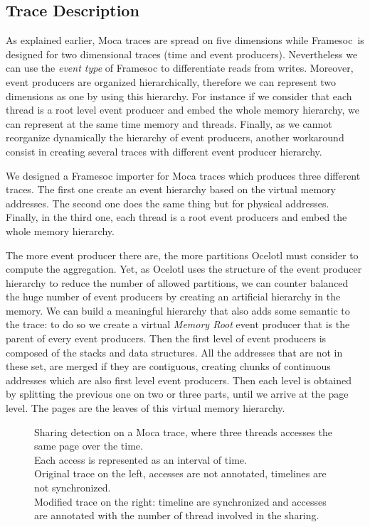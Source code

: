 \subsection{Trace Description}

As explained earlier, \gls{Moca} traces are spread on five dimensions while \gls{Framesoc} is designed for two dimensional traces (time and event producers).
Nevertheless we can use the \emph{event type} of \gls{Framesoc} to differentiate reads from writes.
Moreover, event producers are organized hierarchically, therefore we can represent two dimensions as one by using this hierarchy.
For instance if we consider that each thread is a root level event producer and embed the whole memory hierarchy, we can represent at the same time memory and threads.
Finally, as we cannot reorganize dynamically the hierarchy of event producers, another workaround consist in creating several traces with different event producer hierarchy.

We designed a \gls{Framesoc} importer for \gls{Moca} traces which produces three different traces.
The first one create an event hierarchy based on the virtual memory addresses.
The second one does the same thing but for physical addresses.
Finally, in the third one, each thread is a root event producers and embed the whole memory hierarchy.

The more event producer there are, the more partitions \gls{Ocelotl} must consider to compute the aggregation.
Yet, as \gls{Ocelotl} uses the structure of the event producer hierarchy to reduce the number of allowed partitions, we can counter balanced the huge number of event producers by creating an artificial hierarchy in the memory.
We can build a meaningful hierarchy that also adds some semantic to the trace: to do so we create a virtual \emph{Memory Root} event producer that is the parent of every event producers.
Then the first level of event producers is composed of the stacks and data structures.
All the addresses that are not in these set, are merged if they are contiguous, creating chunks of continuous addresses which are also first level event producers.
Then each level is obtained by splitting the previous one on two or three parts, until we arrive at the page level.
The pages are the leaves of this virtual memory hierarchy.

\begin{figure}[htb]
    \centering
    
    \caption[Sharing detection on Moca traces.]{
        Sharing detection on a Moca trace, where three threads accesses the same page over the time.\\
        Each access is represented as an interval of time.\\
        Original trace on the left, accesses are not annotated, timelines are not synchronized.\\
        Modified trace on the right: timeline are synchronized and accesses are annotated with the number of thread involved in the sharing.
    }
    \label{fig:sharing-detection}
\end{figure}

